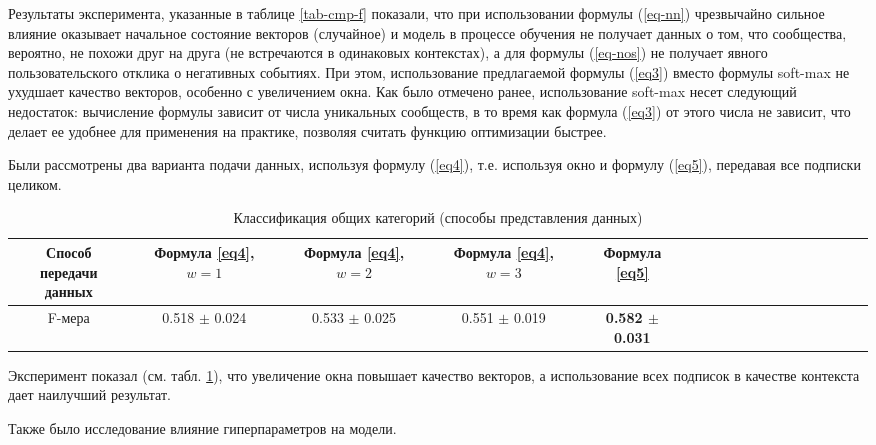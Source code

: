 \documentclass[times,specification,annotation]{itmo-student-thesis}
\begin{document}
Результаты эксперимента, указанные в таблице \ref{tab-cmp-f} показали, что при использовании формулы (\ref{eq-nn}) чрезвычайно сильное влияние оказывает начальное состояние векторов (случайное) и модель в процессе обучения не получает данных о том, что сообщества, вероятно, не похожи друг на друга (не встречаются в одинаковых контекстах), а для формулы (\ref{eq-nos}) не получает явного пользовательского отклика о негативных событиях. При этом, использование предлагаемой формулы (\ref{eq3}) вместо формулы soft-max не ухудшает качество векторов, особенно с увеличением окна. Как было отмечено ранее, использование soft-max несет следующий недостаток: вычисление формулы зависит от числа уникальных сообществ, в то время как формула (\ref{eq3}) от этого числа не зависит, что делает ее удобнее для применения на практике, позволяя считать функцию оптимизации быстрее.

Были рассмотрены два варианта подачи данных, используя формулу (\ref{eq4}), т.е. используя окно и формулу (\ref{eq5}), передавая все подписки целиком. 

\begin{table}[!h]
\caption{Классификация общих категорий (способы представления данных)}\label{tab-cmp-w}
\centering
\begin{tabular}{|*{18}{c|}}\hline
 \thead{Способ \\ передачи данных} &  \thead{Формула \ref{eq4},\\ $w  = 1$}  &  \thead{Формула \ref{eq4},\\ $w  = 2$}  &  \thead{Формула \ref{eq4},\\ $w  = 3$} & Формула \ref{eq5}   \\\hline
F-мера    &  0.518 $\pm$ 0.024 & 0.533 $\pm$ 0.025  &  0.551 $\pm$ 0.019 & \textbf{0.582 $\pm$ 0.031} \\\hline
\end{tabular}
\end{table}

Эксперимент показал (см. табл. \ref{tab-cmp-w}), что увеличение окна повышает качество векторов, а использование всех подписок в качестве контекста дает наилучший результат.

Также было исследование влияние гиперпараметров на модели.  
\end{document}
